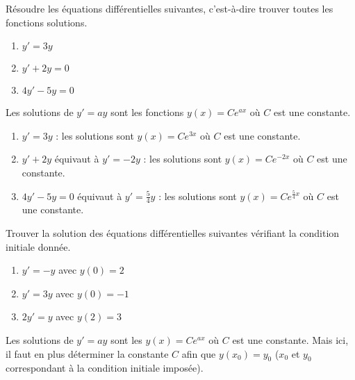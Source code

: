 \documentclass[11pt,class=report,crop=false]{standalone}
\begin{document}


\bigskip
\bigskip




\exercice{}
\enonce
Résoudre les équations différentielles suivantes, c'est-à-dire trouver toutes les fonctions solutions.
\begin{enumerate}
  \item $y'=3y$
  \item $y'+2y=0$
  \item $4y'-5y=0$
\end{enumerate} 
\finenonce

\indication
Les solutions de $y'=ay$ sont les fonctions $y(x)=Ce^{ax}$ où $C$ est une constante.
\finindication

\correction
\sauteligne
\begin{enumerate}
  \item $y'=3y$ : les solutions sont $y(x)=Ce^{3x}$ où $C$ est une constante.
  \item $y'+2y$ équivaut à $y'=-2y$ : les solutions sont $y(x)=Ce^{-2x}$ où $C$ est une constante.
  \item $4y'-5y=0$ équivaut à $y'=\frac54y$  : les solutions sont $y(x)=Ce^{\frac54x}$ où $C$ est une constante.
\end{enumerate}
\fincorrection
\finexercice

\exercice{}
\enonce
Trouver la solution des équations différentielles suivantes vérifiant la condition initiale donnée.
\begin{enumerate}
  \item $y'=-y$ avec $y(0)=2$
  \item $y'=3y$ avec $y(0)=-1$
  \item $2y'=y$ avec $y(2)=3$
\end{enumerate} 
\finenonce

\indication
Les solutions de $y'=ay$ sont les $y(x)=Ce^{ax}$ où $C$ est une constante. 
Mais ici, il faut en plus déterminer la constante $C$ afin que $y(x_0)=y_0$ ($x_0$ et $y_0$ correspondant à la condition initiale imposée).
\finindication
\end{document}
